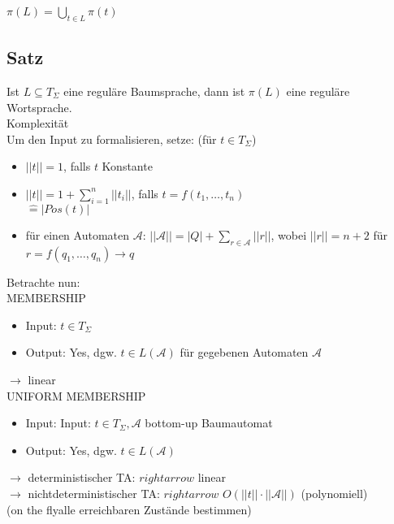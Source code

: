 \documentclass[titlepage]{article}
\begin{document}
$\pi (L) = \bigcup\limits_{t \in L} \pi (t)$

\subsection{Satz}

Ist $L \subseteq T_\Sigma$ eine regul\"are Baumsprache, dann ist $\pi(L)$ eine regul\"are Wortsprache.\\

Komplexit\"at\\

Um den Input zu formalisieren, setze: (f\"ur $t \in T_\Sigma$)

\begin{itemize}
	\item $||t|| = 1$, falls $t$ Konstante
	\item $||t|| = 1 + \sum\limits_{i = 1}^{n} ||t_i||$, falls $t = f(t_1, \dots, t_n)$\\
		$\widehat{=} |Pos(t)|$
	\item f\"ur einen Automaten $\mathcal{A}$: $||\mathcal{A}|| = |Q| + \sum\limits_{r \in \mathcal{A}} ||r||$,
		wobei $||r|| = n + 2$ f\"ur $r = f(q_1, \dots, q_n) \to q$
\end{itemize}

Betrachte  nun:\\
MEMBERSHIP
\begin{itemize}
	\item Input: $t \in T_\Sigma$
	\item Output: \glqq Yes\grqq, dgw. $t \in L(\mathcal{A})$ f\"ur gegebenen Automaten $\mathcal{A}$
\end{itemize}

$\rightarrow$ linear\\

UNIFORM MEMBERSHIP
\begin{itemize}
	\item Input: Input: $t \in T_\Sigma, \mathcal{A}$ bottom-up Baumautomat
	\item Output: \glqq Yes\grqq, dgw. $t \in L(\mathcal{A})$
\end{itemize}

$\rightarrow$ deterministischer TA: $rightarrow$ linear\\
$\rightarrow$ nichtdeterministischer TA: $rightarrow$ $O(||t|| \cdot ||\mathcal{A}||)$ (polynomiell)\\
(\glqq on the fly\grqq alle erreichbaren Zust\"ande bestimmen)\\
\end{document}
